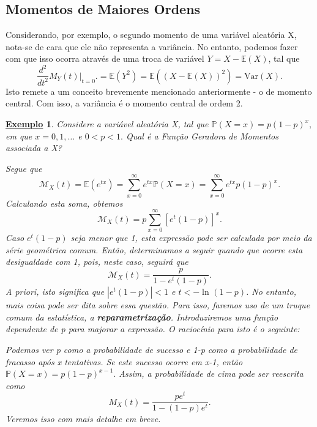 \documentclass{article}
\newtheorem{example}{\underline{Exemplo}}
\begin{document}
\subsection{Momentos de Maiores Ordens}
  Considerando, por exemplo, o segundo momento de uma variável aleatória X,
nota-se de cara que ele não representa a variância. No entanto, podemos fazer com que isso ocorra
através de uma troca de variável \(Y = X - \mathbb{E}(X)\), tal que 
  \[
    \frac{d^{2}}{dt^{2}}M_{Y}(t)\biggl|_{t=0}^{}\biggr. = \mathbb{E}(Y^{2}) = \mathbb{E}((X-\mathbb{E}(X))^{2}) = \mathrm{Var}(X).
  \]
  Isto remete a um conceito brevemente mencionado anteriormente - o de momento central. Com isso, a variância é o momento
central de ordem 2.
\begin{example}
  Considere a variável aleatória X, tal que \(\mathbb{P}(X=x) = p(1-p)^{x},\) em que \(x=0,1,\dotsc\) e \(0 < p < 1.\)
Qual é a Função Geradora de Momentos associada a X?

  Segue que 
  \[
    \mathcal{M}_{X}(t) = \mathbb{E}(e^{tx}) = \sum\limits_{x=0}^{\infty}e^{tx}\mathbb{P}(X=x) = \sum\limits_{x=0}^{\infty}e^{tx}p(1-p)^{x}.
  \]
  Calculando esta soma, obtemos 
  \[
    \mathcal{M}_{X}(t) = p\sum\limits_{x=0}^{\infty}[e^{t}(1-p)]^{x}.
  \]
  Caso \(e^{t}(1-p)\) seja menor que 1, esta expressão pode ser calculada por meio da série geométrica comum.
Então, determinamos a seguir quando que ocorre esta desigualdade com 1, pois, neste caso, seguirá que 
  \[
    \mathcal{M}_{X}(t) = \frac{p}{1-e^{t}(1-p)}.
  \]
  A priori, isto significa que \(|e^{t}(1-p)| < 1\) e \(t < -\ln^{}{(1-p)}\). No entanto, mais coisa pode ser dita 
sobre essa questão. Para isso, faremos uso de um truque comum da estatística, a \textbf{reparametrização}. Introduziremos uma função dependente de p para majorar a expressão.
O raciocínio para isto é o seguinte: 

  Podemos ver p como a probabilidade de sucesso e 1-p como a probabilidade de fracasso após x tentativas. Se
este sucesso ocorre em x-1, então \(\mathbb{P}(X=x) = p(1-p)^{x-1}.\) Assim, a probabilidade de cima pode ser reescrita como 
  \[
    M_{X}(t) = \frac{pe^{t}}{1-(1-p)e^{t}}.
  \]
Veremos isso com mais detalhe em breve.
\end{example}
\end{document}
